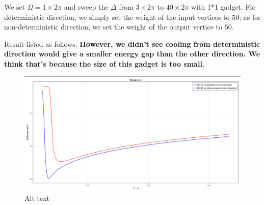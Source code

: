 \documentclass[twocolumn,superscriptaddress,english,showpacs,longbibliography]{revtex4-2}
\begin{document}
We set $\Omega = 1 \times 2\pi$ and sweep the $\Delta$ from $3
\times 2\pi$ to $40 \times 2\pi$ with 1*1 gadget. For deterministic
direction, we simply set the weight of the input vertices to $50$; as
for non-deterministic direction, we set the weight of the output vertice
to $50$.

Result listed as follows. \textbf{However, we didn't see cooling from
deterministic direction would give a smaller energy gap than the other
direction. We think that's because the size of this gadget is too
small.}

\begin{figure}
\centering
\includegraphics[width=\columnwidth]{../notes/images/energy_gap_1_gadget.png}
\caption{Alt text}
\end{figure}
\end{document}
